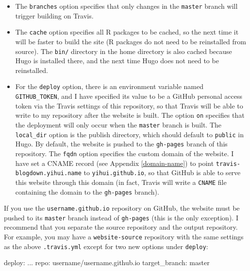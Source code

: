 \documentclass[12pt,]{krantz}
\makeatletter
\newenvironment{Shaded}{\begin{snugshade}}{\end{snugshade}}
\newcommand{\FunctionTok}[1]{\textcolor[rgb]{0.00,0.00,0.00}{#1}}
\newcommand{\AttributeTok}[1]{\textcolor[rgb]{0.77,0.63,0.00}{#1}}
\newcommand{\NormalTok}[1]{#1}
\newenvironment{kframe}{%
\medskip{}
\setlength{\fboxsep}{.8em}
 \def\at@end@of@kframe{}%
 \ifinner\ifhmode%
  \def\at@end@of@kframe{\end{minipage}}%
  \begin{minipage}{\columnwidth}%
 \fi\fi%
 \def\FrameCommand##1{\hskip\@totalleftmargin \hskip-\fboxsep
 \colorbox{shadecolor}{##1}\hskip-\fboxsep
     \hskip-\linewidth \hskip-\@totalleftmargin \hskip\columnwidth}%
 \MakeFramed {\advance\hsize-\width
   \@totalleftmargin\z@ \linewidth\hsize
   \@setminipage}}%
 {\par\unskip\endMakeFramed%
 \at@end@of@kframe}
\renewenvironment{Shaded}{\begin{kframe}}{\end{kframe}}
\theoremstyle{definition}
\theoremstyle{definition}
\theoremstyle{definition}
\theoremstyle{remark}
\makeatother
\begin{document}
\begin{itemize}
\item
  The \texttt{branches} option specifies that only changes in the
  \texttt{master} branch will trigger building on Travis.
\item
  The \texttt{cache} option specifies all R packages to be cached, so
  the next time it will be faster to build the site (R packages do not
  need to be reinstalled from source). The \texttt{bin/} directory in
  the home directory is also cached because Hugo is installed there, and
  the next time Hugo does not need to be reinstalled.
\item
  For the \texttt{deploy} option, there is an environment variable named
  \texttt{GITHUB\_TOKEN}, and I have specified its value to be a GitHub
  personal access token via the Travis settings of this repository, so
  that Travis will be able to write to my repository after the website
  is built. The option \texttt{on} specifies that the deployment will
  only occur when the \texttt{master} branch is built. The
  \texttt{local\_dir} option is the publish directory, which should
  default to \texttt{public} in Hugo. By default, the website is pushed
  to the \texttt{gh-pages} branch of this repository. The \texttt{fqdn}
  option specifies the custom domain of the website. I have set a CNAME
  record (see Appendix \ref{domain-name}) to point
  \texttt{travis-blogdown.yihui.name} to \texttt{yihui.github.io}, so
  that GitHub is able to serve this website through this domain (in
  fact, Travis will write a \texttt{CNAME} file containing the domain to
  the \texttt{gh-pages} branch).
\end{itemize}

If you use the \texttt{username.github.io} repository on GitHub, the
website must be pushed to its \texttt{master} branch instead of
\texttt{gh-pages} (this is the only exception). I recommend that you
separate the source repository and the output repository. For example,
you may have a \texttt{website-source} repository with the same settings
as the above \texttt{.travis.yml} except for two new options under
\texttt{deploy}:

\begin{Shaded}
\begin{Highlighting}[]
\FunctionTok{deploy:}
\NormalTok{  ...}
  \FunctionTok{repo:}\AttributeTok{ username/username.github.io}
  \FunctionTok{target_branch:}\AttributeTok{ master}
\end{Highlighting}
\end{Shaded}
\end{document}
